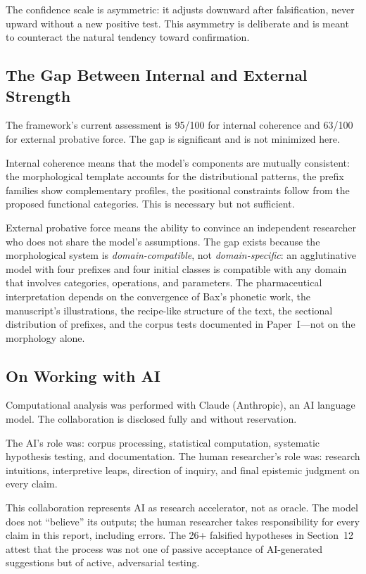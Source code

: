 \documentclass[11pt,a4paper]{article}
\begin{document}
The confidence scale is asymmetric: it adjusts downward after falsification, never upward without a new positive test. This asymmetry is deliberate and is meant to counteract the natural tendency toward confirmation.

\subsection{The Gap Between Internal and External Strength}

The framework's current assessment is 95/100 for internal coherence and 63/100 for external probative force. The gap is significant and is not minimized here.

Internal coherence means that the model's components are mutually consistent: the morphological template accounts for the distributional patterns, the prefix families show complementary profiles, the positional constraints follow from the proposed functional categories. This is necessary but not sufficient.

External probative force means the ability to convince an independent researcher who does not share the model's assumptions. The gap exists because the morphological system is \textit{domain-compatible}, not \textit{domain-specific}: an agglutinative model with four prefixes and four initial classes is compatible with any domain that involves categories, operations, and parameters. The pharmaceutical interpretation depends on the convergence of Bax's phonetic work, the manuscript's illustrations, the recipe-like structure of the text, the sectional distribution of prefixes, and the corpus tests documented in Paper~I---not on the morphology alone.

\subsection{On Working with AI}

Computational analysis was performed with Claude (Anthropic), an AI language model. The collaboration is disclosed fully and without reservation.

The AI's role was: corpus processing, statistical computation, systematic hypothesis testing, and documentation. The human researcher's role was: research intuitions, interpretive leaps, direction of inquiry, and final epistemic judgment on every claim.

This collaboration represents AI as research accelerator, not as oracle. The model does not ``believe'' its outputs; the human researcher takes responsibility for every claim in this report, including errors. The 26+ falsified hypotheses in Section~12 attest that the process was not one of passive acceptance of AI-generated suggestions but of active, adversarial testing.
\end{document}
